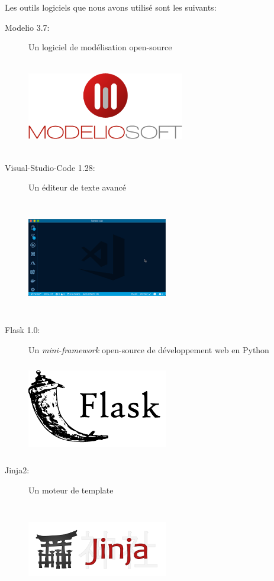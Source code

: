\documentclass[12pt]{report}
\begin{document}
{\flushleft	Les outils logiciels que nous avons utilisé sont les suivants:}
	\begin{description}
		\item[\sc Modelio 3.7:] Un logiciel de modélisation open-source
				\begin{center}
					\includegraphics[scale=1, width=0.56\textwidth, height=4cm]{modelio}
					\label{modelio}
				\end{center}
		
		\item[\sc Visual-Studio-Code 1.28:] Un éditeur de texte avancé
				\begin{center}
					\includegraphics[scale=1, width=0.5\textwidth, height=5cm]{vscode}
					\label{vscode}
				\end{center}
		\item[\sc Flask 1.0:]  Un \textit{mini-framework} open-source de développement web en Python
		
				\begin{center}
					\includegraphics[scale=1, width=0.5\textwidth, height=4cm]{flask}
					\label{flask}
				\end{center}
		\item[\sc Jinja2:] Un moteur de template
			\begin{center}
				\includegraphics[scale=1, width=0.5\textwidth, height=4cm]{jinja}
				\label{jinja}
			\end{center}
			

\end{description}
\end{document}
